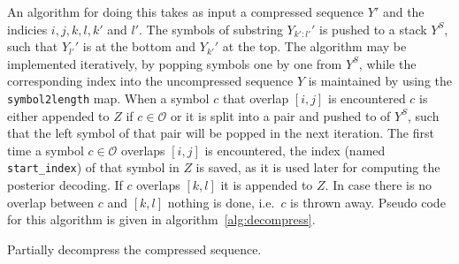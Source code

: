 An algorithm for doing this takes as input a compressed sequence $Y'$ and the
indicies $i, j, k, l, k'$ and $l'$. The symbols of substring $Y_{k':l'}'$ is
pushed to a stack $Y^S$, such that $Y_{l'}'$ is at the bottom and $Y_{k'}'$ at
the top. The algorithm may be implemented iteratively, by popping symbols one
by one from $Y^S$, while the corresponding index into the uncompressed sequence
$Y$ is maintained by using the \texttt{symbol2length} map. When a symbol $c$
that overlap $[i, j]$ is encountered $c$ is either appended to $Z$ if
$c \in \mathcal{O}$ or it is split into a pair and pushed to of $Y^S$, such
that the left symbol of that pair will be popped in the next iteration. The
first time a symbol $c \in \mathcal{O}$ overlaps $[i, j]$ is encountered, the
index (named \texttt{start\_index}) of that symbol in $Z$ is saved, as it is
used later for computing the posterior decoding. If $c$ overlaps $[k, l]$ it is
appended to $Z$. In case there is no overlap between $c$ and $[k, l]$ nothing
is done, i.e.\ $c$ is thrown away. Pseudo code for this algorithm is given in
algorithm~\ref{alg:decompress}.

\begin{algorithm}
  \caption{Partially decompress the compressed sequence.}
  \label{alg:decompress}
  \begin{algorithmic}[1]
                 
                    \EndIf{}
                \Else{}
                     
                \EndIf{}
                 
            \EndIf{}
             
        \EndWhile{}
    \EndProcedure{}
\end{algorithmic}
\end{algorithm}

